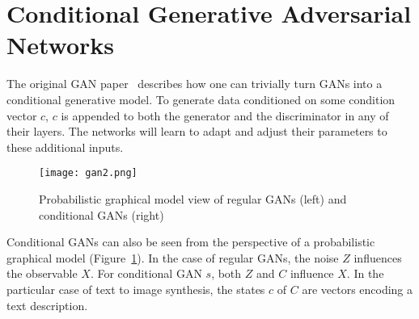 \documentclass[10pt,twocolumn,letterpaper]{article}
\begin{document}
\section{Conditional Generative Adversarial Networks}
The original GAN paper~\cite{name5} describes how one can trivially turn GANs into a conditional generative model. To generate data conditioned on some condition vector $c$, $c$ is appended to both the generator and the discriminator in any of their layers. The networks will learn to adapt and adjust their parameters to these additional inputs.
  \begin{figure}[!htb]
  	\centering
  	\texttt{[image: gan2.png]}\\
  	\caption{Probabilistic graphical model view of regular GANs (left) and conditional GANs (right)}\label{Figure2} 
  \end{figure}
  \par Conditional GANs can also be seen from the perspective of a probabilistic graphical
  model (Figure~\ref{Figure2}). In the case of regular GANs, the noise $Z$ influences the observable $X$.
  For conditional GAN $s$, both $Z$ and $C$ influence $X$. In the particular case of text to image
  synthesis, the states $c$ of $C$ are vectors encoding a text description.


\end{document}
